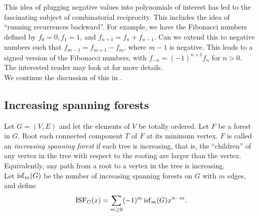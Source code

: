 	This idea of plugging negative values into polynomials of interest has led to the fascinating subject of combinatorial reciprocity. This includes the idea of ``running recurrences backward''. For example, we have the Fibonacci numbers defined by $f_0 = 0, f_1 = 1$, and $f_{n+1} = f_n + f_{n-1}$. Can we extend this to negative numbers such that $f_{m-1} = f_{m+1} - f_{m}$, where $m-1$ is negative. This leads to a signed version of the Fibonacci numbers, with $f_{-n} = (-1)^{n+1} f_n$ for $n > 0$.\\
	The interested reader may look at \cite{crt} for more details.\\
	We continue the discussion of this in .

\subsection{Increasing spanning forests}

	\begin{fdef}
		Let $G = (V,E)$ and let the elements of $V$ be totally ordered. Let $F$ be a forest in $G$. Root each connected component $T$ of $F$ at its minimum vertex. $F$ is called an \emph{increasing spanning forest} if each tree is increasing, that is, the ``children'' of any vertex in the tree with respect to the rooting are larger than the vertex. Equivalently, any path from a root to a vertex in the tree is increasing.\\
		Let $\operatorname{isf}_m(G)$ be the number of increasing spanning forests on $G$ with $m$ edges, and define
		\[ \operatorname{ISF}_G(x) = \sum_{m \ge 0} (-1)^m \operatorname{isf}_m(G) x^{n-m}. \]
	\end{fdef}

